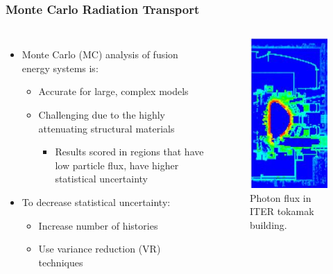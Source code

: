 \documentclass{beamer}
\begin{document}
\begin{frame}
\frametitle{Monte Carlo Radiation Transport}
\begin{columns}

\begin{itemize}
	\item{Monte Carlo (MC) analysis of fusion energy systems is:}
	\begin{itemize}
		\item{Accurate for large, complex models}
		\item{Challenging due to the highly attenuating structural materials}
                  \begin{itemize}
                  \item{Results scored in regions that have low particle flux, have higher statistical uncertainty}
                  \end{itemize}
	\end{itemize}
\item{To decrease statistical uncertainty:}
\begin{itemize}
\item{Increase number of histories}
\item{Use variance reduction (VR) techniques}
\end{itemize}
\end{itemize}

\begin{figure}
	\centering
	\includegraphics[scale=0.5]{iter_pflux.jpg}
	\caption{Photon flux in ITER tokamak building.}
\end{figure}

\end{columns}
\end{frame}
\end{document}
